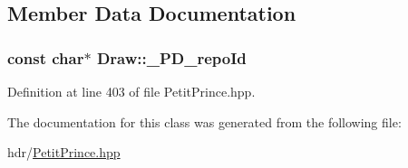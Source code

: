 \subsection{Member Data Documentation}
\subsubsection[{\texorpdfstring{\+\_\+\+P\+D\+\_\+repo\+Id}{_PD_repoId}}]{ const char$\ast$ Draw\+::\+\_\+\+P\+D\+\_\+repo\+Id\hspace{0.3cm}{\ttfamily [static]}}\hypertarget{class_draw_aa81c5a904a215524ca32f588126783bc}{}\label{class_draw_aa81c5a904a215524ca32f588126783bc}


Definition at line 403 of file Petit\+Prince.\+hpp.



The documentation for this class was generated from the following file\+:\begin{DoxyCompactItemize}
\item 
hdr/\hyperlink{_petit_prince_8hpp}{Petit\+Prince.\+hpp}\end{DoxyCompactItemize}
